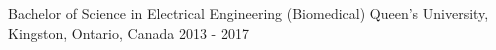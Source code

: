 

\begin{cventries}
  \cventry
    {Bachelor of Science in Electrical Engineering (Biomedical)} %
    {Queen's University, Kingston, Ontario, Canada} %
    {} %
    {2013 - 2017} %
{}
{}
\end{cventries}

